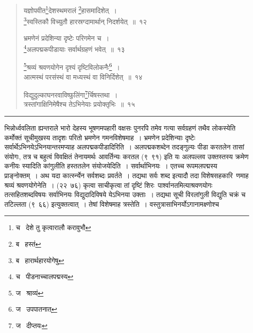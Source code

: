 \documentclass[11pt, openany]{book}
\begin{document}
\begin{quote}
{\na यज्ञोपवीत\renewcommand{\thefootnote}{1}\footnote{च \textendash\  देशे तु कृत्वारालौ करावुभौ}देशस्थमरालं \renewcommand{\thefootnote}{2}\footnote{ब \textendash\  हस्तं}हासमादिशेत्~।\\
\renewcommand{\thefootnote}{3}\footnote{ब \textendash\  हारार्थहारयोगेषु}स्वस्तिकौ विच्युतौ हारस्रग्दामार्थान् निदर्शयेत्~॥~१२

भ्रमणेनं प्रदेशिन्या दृष्टेः परिगमेन च~।\\
\renewcommand{\thefootnote}{4}\footnote{च \textendash\  पीडनाच्चालपद्मस्य}अलपद्मकपीडायाः सर्वार्थग्रहणं भवेत्~॥~१३

\renewcommand{\thefootnote}{5}\footnote{ज \textendash\  श्राव्यं}श्रव्यं श्रवणयोगेन दृश्यं दृष्टिविलोकनैः\renewcommand{\thefootnote}{6}\footnote{ज \textendash\  उपपातनात्}~।\\
आत्मस्थं परसंस्थं वा मध्यस्थं वा विनिर्दिशेत्~॥~१४

विद्युदुल्काघनरवाविष्फुलिंगा\renewcommand{\thefootnote}{7}\footnote{ज \textendash\  दीप्तयः}र्चिषस्तथा~।\\
त्रस्तांगाक्षिनिमेषैश्च तेऽभिनेयाः प्रयोक्तृभिः~॥~१५}
\end{quote}


\hrule

\vspace{2mm}
\noindent
भिन्नोर्ध्ववलिता ह्यन्तराले भारो देहस्य भूषणमपहारी वक्षसः पुनरपि तमेव गत्या सर्वग्रहणं तथैव लोकस्येति कर्मोक्तं सूचीमुखस्य तादृशः परितो भ्रमणेन गमनविशेषमाह~। भ्रमणेन प्रदेशिन्याः दृष्टेः सर्वार्थेऽभिनयेऽभिनयान्तरमप्याह अलपद्मकपीडादिरिति~। अलपद्मकशब्देन तदङ्गुल्यः पीडा करतलेन तासां संयोगः, तत्र च बहुत्वं विवक्षितं तेनायमर्थः {\qt आवर्तिन्यः करतल} (९\textendash\ ९१) इति यः अलपल्लव उक्तस्तस्य क्रमेण कनीयः स्यादिति कांगुलीति हस्ततलेन संयोजयेदिति~। सर्वार्थाभिनयः~। एतच्च रूपमलपद्मस्य प्राङ्नोक्तम्~। अथ यदा कार्त्स्न्येन सर्वशब्दः प्रवर्तते~। तद्यथा सर्वः शब्द इत्यादौ तदा विशेषसहकारि\textendash\ णमाह श्रव्यं श्रवणयोगेनेति~। (२२\textendash\ ७६) {\qt कृत्वा साचीकृत्वा} तां दृष्टिं शिरः\textendash\ पार्श्वानतमित्याश्रवणयोगः तत्सहितशब्दविषयः सर्वाभिनयः विद्युदादिविषये येऽभिनया उक्ताः~। तद्यथा {\qt सूची विरलांगुली विद्युति चक्रं च तटिल्लता} (९\textendash\ ६६) इत्युक्तत्वात्~। तेषां विशेषमाह त्रस्तेति~। वस्तुत्रासाभिनर्योऽगानामक्ष्णोश्च

\newpage
\end{document}
